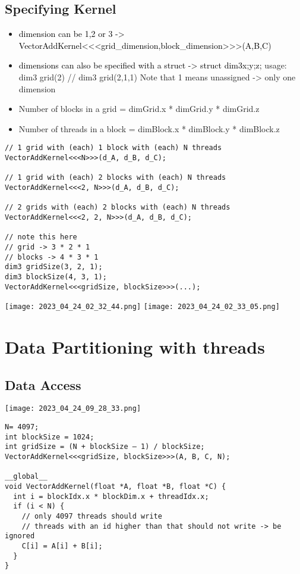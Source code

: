 \documentclass[main.tex,fontsize=8pt,paper=a4,paper=portrait,DIV=calc,]{scrartcl}
\begin{document}
\subsection{Specifying Kernel}
\begin{itemize}
\item \textcolor{black}{dimension can be 1,2 or 3 -> VectorAddKernel<<<grid\_dimension,block\_dimension>>>(A,B,C)}
\item \textcolor{black}{dimensions can also be specified with a struct -> struct dim3{x;y;z};}\newline
  usage: dim3 grid(2) // dim3 grid(2,1,1)\newline
  Note that 1 means unassigned -> only one dimension
\item Number of blocks in a grid = dimGrid.x * dimGrid.y * dimGrid.z
\item  Number of threads in a block = dimBlock.x * dimBlock.y * dimBlock.z
\end{itemize} 
\begin{lstlisting}
// 1 grid with (each) 1 block with (each) N threads
VectorAddKernel<<<N>>>(d_A, d_B, d_C);

// 1 grid with (each) 2 blocks with (each) N threads
VectorAddKernel<<<2, N>>>(d_A, d_B, d_C);

// 2 grids with (each) 2 blocks with (each) N threads
VectorAddKernel<<<2, 2, N>>>(d_A, d_B, d_C);

// note this here
// grid -> 3 * 2 * 1
// blocks -> 4 * 3 * 1
dim3 gridSize(3, 2, 1);
dim3 blockSize(4, 3, 1);
VectorAddKernel<<<gridSize, blockSize>>>(...);
\end{lstlisting}
\texttt{[image: 2023\_04\_24\_02\_32\_44.png]}\newline
\texttt{[image: 2023\_04\_24\_02\_33\_05.png]}


\section{Data Partitioning with threads}
\subsection{Data Access}
\texttt{[image: 2023\_04\_24\_09\_28\_33.png]}
\begin{lstlisting}
N= 4097;
int blockSize = 1024;
int gridSize = (N + blockSize – 1) / blockSize;
VectorAddKernel<<<gridSize, blockSize>>>(A, B, C, N);

__global__
void VectorAddKernel(float *A, float *B, float *C) {
  int i = blockIdx.x * blockDim.x + threadIdx.x;
  if (i < N) {
    // only 4097 threads should write
    // threads with an id higher than that should not write -> be ignored
    C[i] = A[i] + B[i];
  }
}
\end{lstlisting}
\end{document}
